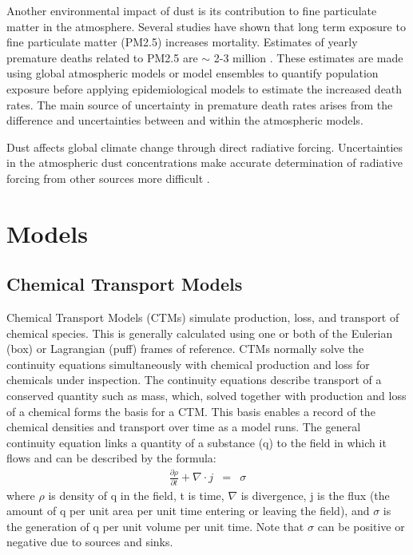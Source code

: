   Another environmental impact of dust is its contribution to fine particulate matter in the atmosphere.
  Several studies have shown that long term exposure to fine particulate matter (PM2.5) increases mortality. 
  Estimates of yearly premature deaths related to PM2.5 are $\sim$ 2-3 million \citep{Hoek_2013, Krewski_2009, Silva_2013, Lelieveld_2015}.   
  These estimates are made using global atmospheric models or model ensembles to quantify population exposure before applying epidemiological models to estimate the increased death rates.
  The main source of uncertainty in premature death rates arises from the difference and uncertainties between and within the atmospheric models.

  Dust affects global climate change through direct radiative forcing.
  Uncertainties in the atmospheric dust concentrations make accurate determination of radiative forcing from other sources more difficult \citep{IPCC_2013_chap8}.


\section{Models}
\label{ch1:sec:models}

  \subsection{Chemical Transport Models}
  
    Chemical Transport Models (CTMs) simulate production, loss, and transport of chemical species.
    This is generally calculated using one or both of the Eulerian (box) or Lagrangian (puff) frames of reference.
    CTMs normally solve the continuity equations simultaneously with chemical production and loss for chemicals under inspection. 
    The continuity equations describe transport of a conserved quantity such as mass, which, solved together with production and loss of a chemical forms the basis for a CTM.
    This basis enables a record of the chemical densities and transport over time as a model runs.
    The general continuity equation links a quantity of a substance (q) to the field in which it flows and can be described by the formula:
    \begin{eqnarray*}
	\frac{\partial \rho}{\partial t} + \nabla \cdot j &=& \sigma 
    \end{eqnarray*}
    where $\rho$ is density of q in the field, t is time, $\nabla$ is divergence, j is the flux (the amount of q per unit area per unit time entering or leaving the field), and $\sigma$ is the generation of q per unit volume per unit time.
    Note that $\sigma$ can be positive or negative due to sources and sinks.

